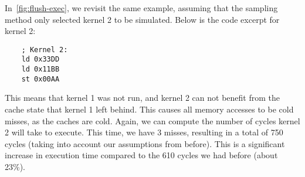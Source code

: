 In~\cref{fig:flush-exec}, we revisit the same example, assuming that the sampling method only selected kernel 2 to be simulated.
Below is the code excerpt for kernel 2:
\begin{verbatim}
    ; Kernel 2:
    ld 0x33DD
    ld 0x11BB
    st 0x00AA
\end{verbatim}

This means that kernel 1 was not run, and kernel 2 can not benefit from the cache state that kernel 1 left behind.
This causes all memory accesses to be cold misses, as the caches are cold.
Again, we can compute the number of cycles kernel 2 will take to execute.
This time, we have 3 misses, resulting in a total of 750 cycles (taking into account our assumptions from before).
This is a significant increase in execution time compared to the 610 cycles we had before (about 23\%).
